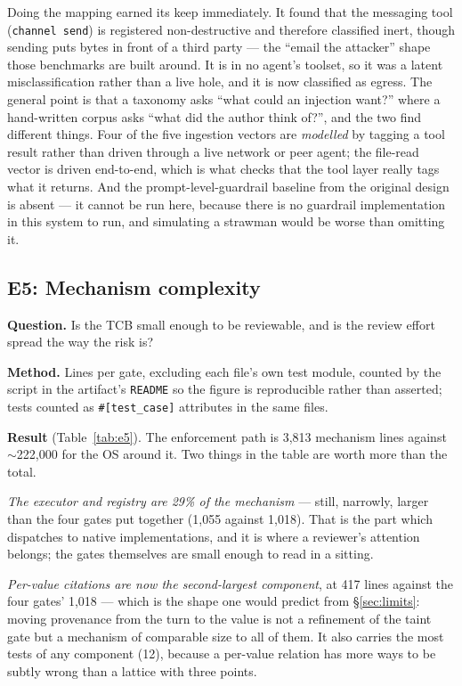 \documentclass[11pt]{article}
\newcommand{\code}[1]{\texttt{#1}}
\begin{document}
Doing the mapping earned its keep immediately. It found that the messaging tool
(\code{channel send}) is registered non-destructive and therefore classified
inert, though sending puts bytes in front of a third party --- the ``email the
attacker'' shape those benchmarks are built around. It is in no agent's toolset,
so it was a latent misclassification rather than a live hole, and it is now
classified as egress. The general point is that a taxonomy asks ``what could an
injection want?'' where a hand-written corpus asks ``what did the author think
of?'', and the two find different things. Four of the five
ingestion vectors are \emph{modelled} by tagging a tool result rather than
driven through a live network or peer agent; the file-read vector is driven
end-to-end, which is what checks that the tool layer really tags what it
returns. And the prompt-level-guardrail baseline from the original design is
absent --- it cannot be run here, because there is no guardrail implementation in
this system to run, and simulating a strawman would be worse than omitting it.

\subsection{E5: Mechanism complexity}
\label{sec:e5}

\textbf{Question.} Is the TCB small enough to be reviewable, and is the review
effort spread the way the risk is?

\textbf{Method.} Lines per gate, excluding each file's own test module, counted
by the script in the artifact's \code{README} so the figure is reproducible
rather than asserted; tests counted as \code{\#[test\_case]} attributes in the
same files.

\textbf{Result} (Table~\ref{tab:e5}). The enforcement path is 3{,}813 mechanism
lines against $\sim$222{,}000 for the OS around it. Two things in the table are worth
more than the total.

\emph{The executor and registry are 29\% of the mechanism} --- still, narrowly,
larger than the four gates put together (1{,}055 against 1{,}018). That is the
part which dispatches to native implementations, and it is where a reviewer's
attention belongs; the gates themselves are small enough to read in a sitting.

\emph{Per-value citations are now the second-largest component}, at 417 lines
against the four gates' 1{,}018 --- which is the shape one would predict from
\S\ref{sec:limits}: moving provenance from the turn to the value is not a
refinement of the taint gate but a mechanism of comparable size to all of them.
It also carries the most tests of any component (12), because a per-value
relation has more ways to be subtly wrong than a lattice with three points.
\end{document}
